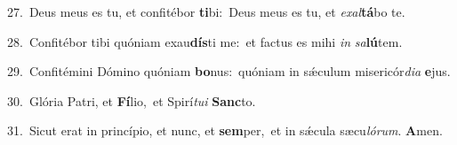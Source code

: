 {\numbfont\textcolor{\numbcolor}{27.}}~Deus meus es tu, et confitébor \textbf{ti}\-bi:~\star Deus meus es tu, et \textit{ex}\-\textit{al}\textbf{tá}bo te.\par
{\numbfont\textcolor{\numbcolor}{28.}}~Confitébor tibi quóniam exau\-\textbf{dís}\-ti me:~\star et factus es mihi \textit{in} \textit{sa}\-\textbf{lú}tem.\par
{\numbfont\textcolor{\numbcolor}{29.}}~Confitémini Dómino quóniam \textbf{bo}\-nus:~\star quóniam in sǽculum misericór\-\textit{di}\-\textit{a} \textbf{e}\-jus.\par
{\numbfont\textcolor{\numbcolor}{30.}}~Glória Patri, et \textbf{Fí}\-lio,~\star et Spirí\-\textit{tu}\-\textit{i} \textbf{Sanc}\-to.\par
{\numbfont\textcolor{\numbcolor}{31.}}~Sicut erat in princípio, et nunc, et \textbf{sem}\-per,~\star et in sǽcula sæcu\-\textit{ló}\-\textit{rum}. \textbf{A}\-men.\par
